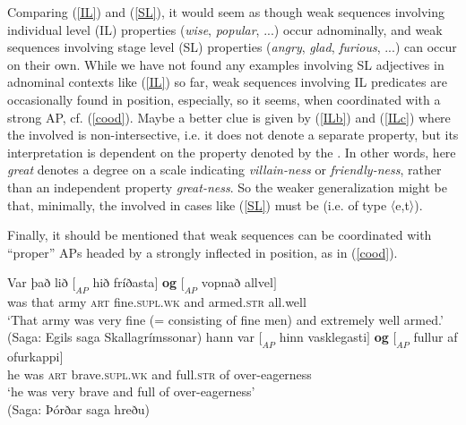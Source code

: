 \documentclass[output=paper,colorlinks,citecolor=brown]{langscibook}
\begin{document}
Comparing (\ref{IL}) and  (\ref{SL}), it would seem as though weak sequences involving individual level (IL) properties (\textit{wise}, \textit{popular}, ...) occur adnominally, and weak sequences involving stage level (SL) properties ({\textit{angry}, \textit{glad}, \textit{furious}, ...}) can occur on their own. While we have not found any examples involving SL adjectives in adnominal contexts like (\ref{IL}) so far, weak sequences involving  IL predicates are occasionally found  in  position, especially, so it seems, when coordinated with a strong AP, cf. (\ref{cood}). Maybe a better clue is given by  (\ref{ILb}) and (\ref{ILc}) where the  involved is  non-intersective, i.e. it does not denote a separate property, but its interpretation is dependent on the property denoted by the . In other words, here \textit{great} denotes a degree on a scale indicating \textit{villain-ness} or \textit{friendly-ness}, rather than an independent property \textit{great-ness}.  So the weaker generalization might be that, minimally, the  involved in cases like (\ref{SL}) must be   (i.e. of type 〈e,t〉). 

Finally, it should be mentioned that weak sequences  can be coordinated with ``proper'' APs headed by a strongly inflected  in  position, as in (\ref{cood}).

\begin{exe}
\ex \label{cood}   
    \begin{xlist}
         \ex\gll   Var það lið  $[_{AP}$ hið  fríðasta$]$  {\textbf{og}}  $[_{AP}$ vopnað allvel$]$ \\ 
           was that army  { } \textsc{art} fine.\textsc{supl.wk} and { } armed.\textsc{str} all.well \\ 
           \glt `That army was very fine (= consisting of fine men) and extremely well armed.'   (Saga: Egils saga Skallagrímssonar)
          \ex\gll   hann  var   $[_{AP}$ hinn  vasklegasti$]$  {\textbf{og}}  $[_{AP}$ fullur     af  ofurkappi$]$   \\
           he was   {} \textsc{art} brave.\textsc{supl.wk} and {} full.\textsc{str} of over-eagerness  \\ 
           \glt `he was very brave and full of over-eagerness' \\ 
           \glt (Saga: Þórðar saga hreðu) 
\end{xlist} 
\end{exe} 
\end{document}
